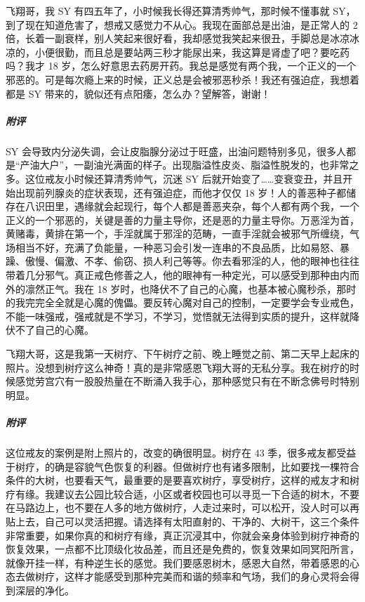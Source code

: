 \begin{case}
    飞翔哥，我 SY 有四五年了，小时候我长得还算清秀帅气，那时候不懂事就 SY，到了现在知道危害了，想戒又感觉力不从心。我现在面部总是出油，是正常人的 2 倍，长着一副衰样，别人笑起来很好看，我却感觉我笑起来很丑，手脚总是冰凉冰凉的，小便很勤，而且总是要站两三秒才能尿出来，我这算是肾虚了吧？要吃药吗？我才 18 岁，怎么好意思去药房开药。我总是感觉有两个我，一个正义的一个邪恶的。可是每次瘾上来的时候，正义总是会被邪恶秒杀！我还有强迫症，我想着都是 SY 带来的，貌似还有点阳痿，怎么办？望解答，谢谢！
    \subparagraph{附评} SY 会导致内分泌失调，会让皮脂腺分泌过于旺盛，出油问题特别多见，很多人都是“产油大户”，一副油光满面的样子。出现脂溢性皮炎、脂溢性脱发的，也非常之多。这位戒友小时候还算清秀帅气，沉迷 SY 后就开始变了……变衰变丑，并且开始出现前列腺炎的症状表现，还有强迫症，而他才仅仅 18 岁！人的善恶种子都储存在八识田里，遇缘就会起现行，每个人都是善恶夹杂，每个人都有两个我，一个正义的一个邪恶的，关键是善的力量主导你，还是恶的力量主导你。万恶淫为首，黄赌毒，黄排在第一个，手淫就属于邪淫的范畴，一直手淫就会被邪气所缠绕，气场相当不好，充满了负能量，一种恶习会引发一连串的不良品质，比如易怒、暴躁、傲慢、偏激、不孝、偷窃、损人利己等等。你去看邪淫的人，他的眼神也往往带着几分邪气。真正戒色修善之人，他的眼神有一种定光，可以感受到那种由内而外的凛然正气。我在 18 岁时，也降伏不了自己的心魔，也基本被心魔秒杀，那时的我完完全全就是心魔的傀儡。要反转心魔对自己的控制，一定要学会专业戒色，不能一味强戒，强戒就是不学习，不学习，觉悟就无法得到实质的提升，这样就降伏不了自己的心魔。
\end{case}

\begin{case}
    飞翔大哥，这是我第一天树疗、下午树疗之前、晚上睡觉之前、第二天早上起床的照片。没想到树疗这么神奇！真的是非常感恩飞翔大哥的无私分享。我在树疗的时候感觉劳宫穴有一股股热量在不断涌入我手心，那种感觉只有在不断念佛号时特别明显。
    \subparagraph{附评} 这位戒友的案例是附上照片的，改变的确很明显。树疗在 43 季，很多戒友都受益于树疗，的确是容貌气色恢复的利器。但做树疗也有诸多限制，比如要找一棵符合条件的大树，也要看天气，最重要的是要喜欢树疗，享受树疗，这样的戒友才和树疗有缘。我建议去公园比较合适，小区或者校园也可以寻觅一下合适的树木，不要在马路边上，也不要在人多的地方做树疗，人走过来时，可以松开，没人时可以再贴上去，自己可以灵活把握。请选择有太阳直射的、干净的、大树干，这三个条件非常重要，如果你真的和树疗有缘，真正沉浸其中，你就会亲身体验到树疗神奇的恢复效果，一点都不比顶级化妆品差，而且还是免费的，恢复效果如同冥阳所言，就像开挂一样，有种逆生长的感觉。我们要感恩树木，感恩大自然，带着感恩的心态去做树疗，这样才能感受到那种完美而和谐的频率和气场，我们的身心灵将会得到深层的净化。
\end{case}


